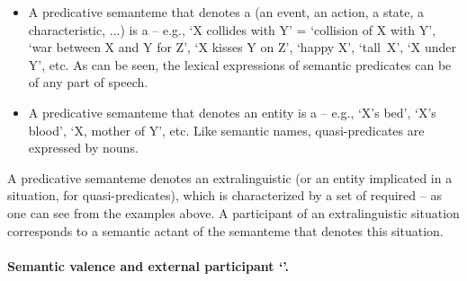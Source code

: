 \begin{itemize}

\item A predicative semanteme that denotes a  (an event, an action, a state, a characteristic, ...) is a  -- e.g., `X collides with Y' = `collision of X with Y', `war between X and Y for Z', `X kisses Y on Z', `happy X', `tall~X', `X under Y', etc. As can be seen, the lexical expressions of semantic predicates can be of any part of speech.

\item{}\label{item:quasi-predicate} A predicative semanteme that denotes an entity is a  -- e.g., `X's bed', `X's blood', `X, mother of Y', etc. Like semantic names, quasi-predicates are expressed by nouns.

\end{itemize}

A predicative semanteme denotes an extralinguistic  (or an entity implicated in a situation, for quasi-predicates), which is characterized by a set of required  -- as one can see from the examples above. A participant of an extralinguistic situation corresponds to a semantic actant of the semanteme that denotes this situation.

\paragraph*{Semantic valence and external participant `\textOmega'.}\label{par:externalParticipant}\label{par:semanticValence}

